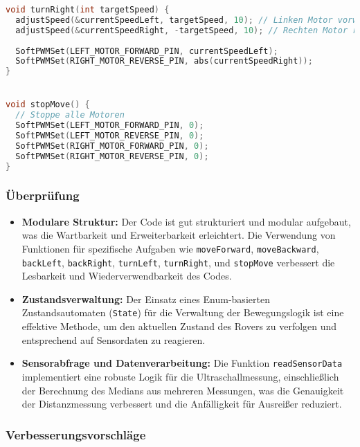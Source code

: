 \documentclass{vorlage-design-main}
\begin{document}
\begin{lstlisting}[language={C++}]
void turnRight(int targetSpeed) {
  adjustSpeed(&currentSpeedLeft, targetSpeed, 10); // Linken Motor vorwärts für Rechtsdrehung
  adjustSpeed(&currentSpeedRight, -targetSpeed, 10); // Rechten Motor rückwärts
  
  SoftPWMSet(LEFT_MOTOR_FORWARD_PIN, currentSpeedLeft);
  SoftPWMSet(RIGHT_MOTOR_REVERSE_PIN, abs(currentSpeedRight));
}


void stopMove() {
  // Stoppe alle Motoren
  SoftPWMSet(LEFT_MOTOR_FORWARD_PIN, 0);
  SoftPWMSet(LEFT_MOTOR_REVERSE_PIN, 0);
  SoftPWMSet(RIGHT_MOTOR_FORWARD_PIN, 0);
  SoftPWMSet(RIGHT_MOTOR_REVERSE_PIN, 0);
}
\end{lstlisting}

\hypertarget{uxfcberpruxfcfung}{%
\subsubsection{Überprüfung}\label{ueberpruefung}}

\begin{itemize}
\item
  \textbf{Modulare Struktur:} Der Code ist gut strukturiert und modular
  aufgebaut, was die Wartbarkeit und Erweiterbarkeit erleichtert. Die
  Verwendung von Funktionen für spezifische Aufgaben wie
  \verb|moveForward|,
  \verb|moveBackward|,
  \verb|backLeft|,
  \verb|backRight|,
  \verb|turnLeft|,
  \verb|turnRight|, und
  \verb|stopMove| verbessert die Lesbarkeit und
  Wiederverwendbarkeit des Codes.
\item
  \textbf{Zustandsverwaltung:} Der Einsatz eines Enum-basierten
  Zustandsautomaten (\verb|State|) für die Verwaltung
  der Bewegungslogik ist eine effektive Methode, um den aktuellen
  Zustand des Rovers zu verfolgen und entsprechend auf Sensordaten zu
  reagieren.
\item
  \textbf{Sensorabfrage und Datenverarbeitung:} Die Funktion
  \verb|readSensorData| implementiert eine robuste
  Logik für die Ultraschallmessung, einschließlich der Berechnung des
  Medians aus mehreren Messungen, was die Genauigkeit der Distanzmessung
  verbessert und die Anfälligkeit für Ausreißer reduziert.
\end{itemize}

\hypertarget{verbesserungsvorschluxe4ge}{%
\subsubsection{Verbesserungsvorschläge}\label{verbesserungsvorschlaege}}
\end{document}

